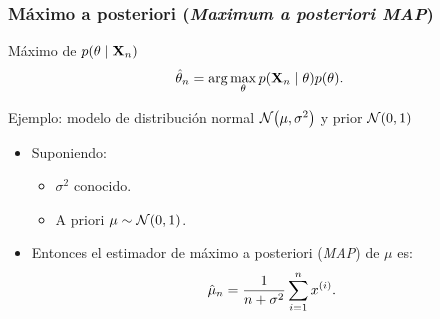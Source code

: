 \documentclass[table]{beamer}
\begin{document}
\begin{frame}
    \frametitle{Máximo a posteriori (\emph{Maximum a posteriori MAP})}
    \begin{block}{Máximo de $\pdf{\theta \mid \Xvec_{n}}$}
        \begin{equation*}
            \hat{\theta}_{n}
            = \arg \max_{\theta} \pdf{\Xvec_{n} \mid \theta} \pdf{\theta} .
        \end{equation*}
    \end{block}
    \begin{exampleblock}{Ejemplo: modelo de distribución normal $\normal{\mu}{\sigma^{2}}$ y prior $\normal{0}{1}$}
        \begin{itemize}
            \item Suponiendo:
                \begin{itemize}
                    \item $\sigma^{2}$ conocido.
                    \item A priori $\mu \sim \normal{0}{1}$.
                \end{itemize}
            \item Entonces el estimador de máximo a posteriori (\emph{MAP}) de $\mu$ es:
                \begin{equation*}
                    \hat{\mu}_{n} = \frac{1}{n + \sigma^{2}} \sum_{i = 1}^{n} x^{\parens{i}} .
                \end{equation*}
        \end{itemize}
    \end{exampleblock}
\end{frame}
\end{document}

